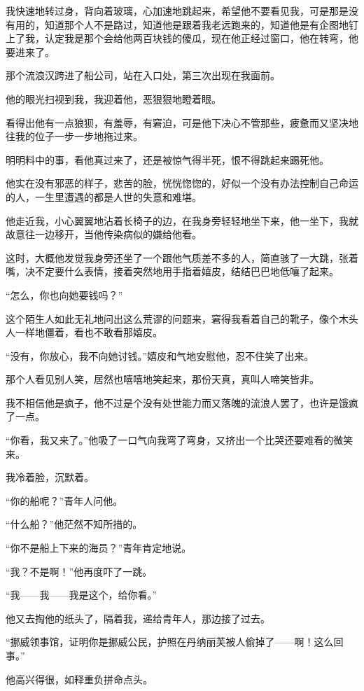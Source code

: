 \par 我快速地转过身，背向着玻璃，心加速地跳起来，希望他不要看见我，可是那是没有用的，知道那个人不是路过，知道他是跟着我老远跑来的，知道他是有企图地钉上了我，认定我是那个会给他两百块钱的傻瓜，现在他正经过窗口，他在转弯，他要进来了。
\par 那个流浪汉跨进了船公司，站在入口处，第三次出现在我面前。
\par 他的眼光扫视到我，我迎着他，恶狠狠地瞪着眼。
\par 看得出他有一点狼狈，有羞辱，有窘迫，可是他下决心不管那些，疲惫而又坚决地往我的位子一步一步地拖过来。
\par 明明料中的事，看他真过来了，还是被惊气得半死，恨不得跳起来踢死他。
\par 他实在没有邪恶的样子，悲苦的脸，恍恍惚惚的，好似一个没有办法控制自己命运的人，一生里遭遇的都是人世的失意和难堪。
\par 他走近我，小心翼翼地沾着长椅子的边，在我身旁轻轻地坐下来，他一坐下，我就故意往一边移开，当他传染病似的嫌给他看。
\par 这时，大概他发觉我身旁还坐了一个跟他气质差不多的人，简直骇了一大跳，张着嘴，决不定要什么表情，接着突然地用手指着嬉皮，结结巴巴地低嚷了起来。
\par “怎么，你也向她要钱吗？”
\par 这个陌生人如此无礼地问出这么荒谬的问题来，窘得我看着自己的靴子，像个木头人一样地僵着，看也不敢看那嬉皮。
\par “没有，你放心，我不向她讨钱。”嬉皮和气地安慰他，忍不住笑了出来。
\par 那个人看见别人笑，居然也嘻嘻地笑起来，那份天真，真叫人啼笑皆非。
\par 我不相信他是疯子，他不过是个没有处世能力而又落魄的流浪人罢了，也许是饿疯了一点。
\par “你看，我又来了。”他吸了一口气向我弯了弯身，又挤出一个比哭还要难看的微笑来。
\par 我冷着脸，沉默着。
\par “你的船呢？”青年人问他。
\par “什么船？”他茫然不知所措的。
\par “你不是船上下来的海员？”青年肯定地说。
\par “我？不是啊！”他再度吓了一跳。
\par “我——我——我是这个，给你看。”
\par 他又去掏他的纸头了，隔着我，递给青年人，那边接了过去。
\par “挪威领事馆，证明你是挪威公民，护照在丹纳丽芙被人偷掉了——啊！这么回事。”
\par 他高兴得很，如释重负拼命点头。
